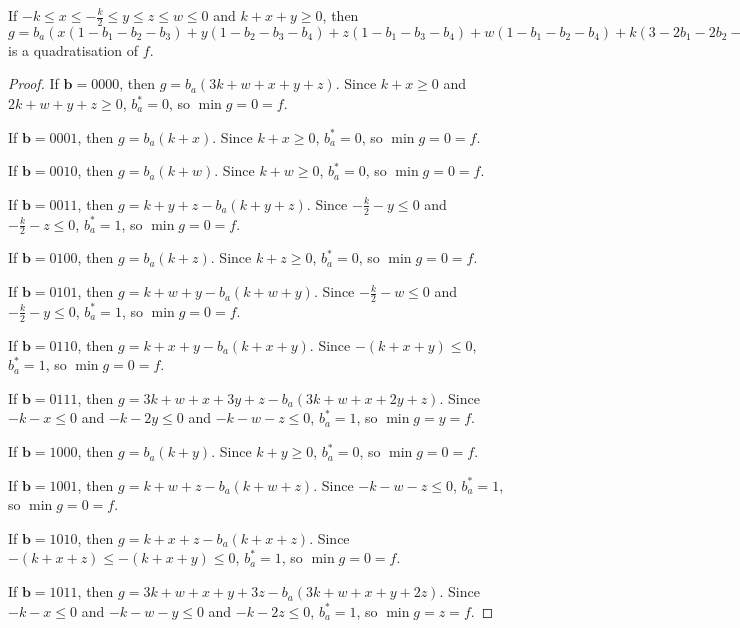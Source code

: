 \documentclass[11pt]{scrartcl}
\newcommand{\vc}[1]{\boldsymbol{#1}}
\begin{document}
\begin{lemma}
	\label{case6}
	If $-k\le x \le -\frac{k}{2} \le y \le z \le w \le 0$ and $k+x+y \ge 0$, then $g = b_a(x(1-b_1-b_2-b_3)+y(1-b_2-b_3-b_4)+z(1-b_1-b_3-b_4)+w(1-b_1-b_2-b_4)+k(3-2b_1-2b_2-2b_3-2b_4))+x(+b_1b_2+b_1b_3+b_2b_3)+y(+b_2b_3+b_2b_4+b_3b_4)+z(+b_1b_3+b_1b_4+b_3b_4)+w(+b_1b_2+b_1b_4+b_2b_4)+k(+b_1b_2+b_1b_3+b_1b_4+b_2b_3+b_2b_4+b_3b_4)$ is a quadratisation of $f$.
 \end{lemma}

\begin{proof}
If $\vc b = 0000$, then $g = b_a(3k + w + x + y + z)$.
Since $k+x \ge 0 $ and $2k + w + y + z \ge 0$, $b_a^* = 0$, so $\min g = 0 = f$.

If $\vc b = 0001$, then $g = b_a(k + x)$.
Since $k+x \ge 0$, $b_a^* = 0$, so $\min g = 0 = f$.

If $\vc b = 0010$, then $g = b_a(k + w)$.
Since $k+w \ge 0$, $b_a^* = 0 $, so $\min g = 0 = f$.

If $\vc b = 0011$, then $g = k + y + z - b_a(k + y + z)$.
Since $-\frac{k}{2} - y \le 0$ and $-\frac{k}{2} - z \le 0$, $b_a^* = 1$, so $\min g = 0 = f$.

If $\vc b = 0100$, then $g = b_a(k + z)$.
Since $k + z \ge 0 $, $b_a^* = 0$, so $\min g = 0 = f$.

If $\vc b = 0101$, then $g = k + w + y - b_a(k + w + y)$.
Since $- \frac{k}{2} - w \le 0$ and $- \frac{k}{2} - y \le 0$, $b_a^* = 1$, so $\min g = 0 = f$.

If $\vc b = 0110$, then $g = k + x + y - b_a(k + x + y)$.
Since $-(k+x+y) \le 0$, $b_a^* = 1$, so $\min g = 0 = f$. 

If $\vc b = 0111$, then $g = 3k + w + x + 3y + z - b_a(3k + w + x + 2y + z)$.
Since $-k - x \le 0$ and $-k - 2y \le 0$ and $-k - w - z \le 0$, $b_a^* = 1$, so $\min g = y = f$.

If $\vc b = 1000$, then $g = b_a(k + y)$.
Since $k + y \ge 0$, $b_a^* = 0 $, so $\min g = 0 = f$.

If $\vc b = 1001$, then $g = k + w + z - b_a(k + w + z)$.
Since $-k - w - z \le 0$, $b_a^* = 1$, so $\min g = 0 = f$.

If $\vc b = 1010$, then $g = k + x + z - b_a(k + x + z)$.
Since $-(k+x+z) \le -(k+x+y) \le 0$, $b_a^* = 1$, so $\min g = 0 = f$.

If $\vc b = 1011$, then $g = 3k + w + x + y + 3z - b_a(3k + w + x + y + 2z)$.
Since $-k - x\le 0 $ and $-k - w - y \le 0$ and $-k - 2z \le 0$, $b_a^* = 1$, so $\min g = z = f$.  


\end{proof}
\end{document}
